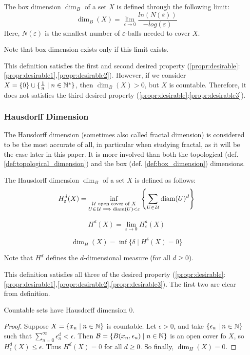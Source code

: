\begin{definition}\label{def:box_dimension}
	The box dimension $\dim_B$ of a set $X$ is defined through the following limit:
	$$
	\dim_B(X) = \lim_{\varepsilon \to 0} \frac{ln(N(\varepsilon))}{-log(\varepsilon)}
	$$
	Here, $N(\varepsilon)$ is the smallest number of $\varepsilon$-balls needed to cover $X$.
	
	Note that box dimension exists only if this limit exists.
\end{definition}

This definition satisfies the first and second desired property (\ref{propr:desirable}:\ref{propr:desirable1},\ref{propr:desirable2}).
However, if we consider $X = \{0\} \cup \{\frac{1}{n} \mid n \in \mathbb{N}^*\}$, then $\dim_B(X) > 0$, but $X$ is countable.
Therefore, it does not satisfies the third desired property (\ref{propr:desirable}:\ref{propr:desirable3}).

\subsubsection{Hausdorff Dimension}
The Hausdorff dimension (sometimes also called fractal dimension) is considered to be the most accurate of all, in particular when studying fractal, as it will be the case later in this paper.
It is more involved than both the topological (def. \ref{def:topological_dimension}) and the box (def. \ref{def:box_dimension}) dimensions.

\begin{definition}\label{def:Hausdorff_dimension}
	The Hausdorff dimension $\dim_B$ of a set $X$ is defined as follows:
	$$
	H_{\varepsilon}^d(X) = 
	\inf_{\substack{\mathcal{U} \text{ open cover of } X\\
			U \in \, \mathcal{U} \implies \text{diam}(U) < \varepsilon}}
		\left\lbrace \sum_{U \in \, \mathcal{U}} \text{diam}(U)^d \right\rbrace
	$$
	
	$$
	H^d(X) = \lim_{\varepsilon \to 0} H_{\varepsilon}^d(X)
	$$
	
	$$
	\dim_H(X) = \inf \{ \delta \mid H^{\delta}(X) = 0 \}
	$$
	
	Note that $H^d$ defines the $d$-dimensional measure (for all $d \geq 0$).
\end{definition}

This definition satisfies all three of the desired property (\ref{propr:desirable}:\ref{propr:desirable1},\ref{propr:desirable2},\ref{propr:desirable3}).
The first two are clear from definition.
\begin{property}
	Countable sets have Hausdorff dimension 0.
\end{property}
\begin{proof}
	Suppose $X = \{ x_n \mid n \in \mathbb{N} \}$ is countable.
	Let $\epsilon > 0$, and take $\{ \epsilon_n \mid n \in \mathbb{N} \}$ such that $\sum_{n=0}^{\infty} \epsilon_n^d < \epsilon$.
	Then $\mathcal{B} = \{ B(x_n,\epsilon_n) \mid n \in \mathbb{N} \}$ is an open cover fo $X$, so $H_{\epsilon}^d(X) \leq \epsilon$.
	Thus $H^d(X) = 0$ for all $d \geq 0$.
	So finally, $\dim_H(X) = 0$.
\end{proof}

